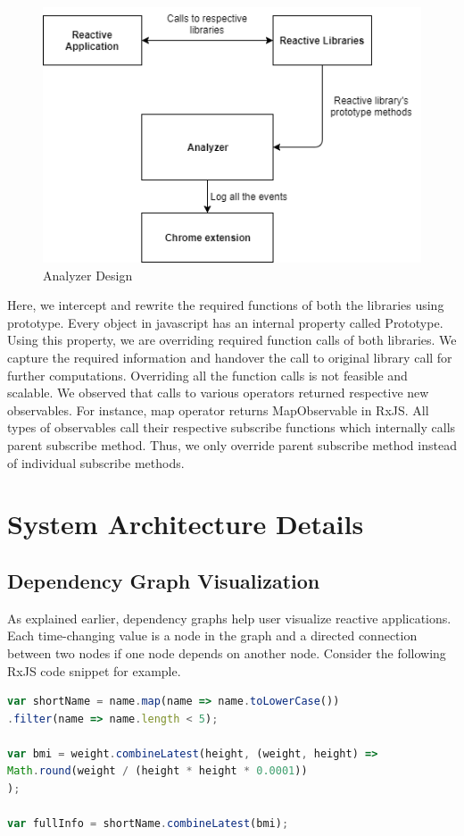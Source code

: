 \begin{figure}[!h]
	\centering
	\includegraphics[scale=0.6,trim=0 0 0 0]{images/analyzer-design.png}
	\caption{Analyzer Design}
	\label{fig:analyzer-design}
\end{figure}

Here, we intercept and rewrite the required functions of both the libraries using prototype\cite{prototype}. Every object in javascript has an internal property called Prototype. Using this property, we are overriding required function calls of both libraries. We capture the required information and handover the call to original library call for further computations. Overriding all the function calls is not feasible and scalable. We observed that calls to various operators returned respective new observables. For instance, map operator returns MapObservable in RxJS. All types of observables call their respective subscribe functions which internally calls parent subscribe method. Thus, we only override parent subscribe method instead of individual subscribe methods. 

\section{System Architecture Details}
\subsection{Dependency Graph Visualization}
As explained earlier, dependency graphs help user visualize reactive applications. Each time-changing value is a node in the graph and a directed connection between two nodes if one node depends on another node. Consider the following RxJS code snippet for example. 
\begin{lstlisting}[language=JavaScript, caption=RxJS code example, label={lst:rxjs-code-example}]
var shortName = name.map(name => name.toLowerCase())
.filter(name => name.length < 5);

var bmi = weight.combineLatest(height, (weight, height) =>
Math.round(weight / (height * height * 0.0001))
);

var fullInfo = shortName.combineLatest(bmi);
\end{lstlisting}

